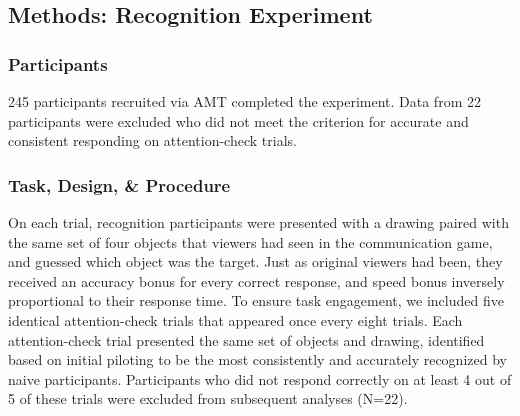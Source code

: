 \documentclass[10pt,letterpaper]{article}
\begin{document}

\subsection{Methods: Recognition Experiment}

\subsubsection{Participants}

245 participants recruited via AMT completed the experiment. Data from 22 participants were excluded who did not meet the criterion for accurate and consistent responding on attention-check trials.

\subsubsection{Task, Design, \& Procedure}

On each trial, recognition participants were presented with a drawing paired with the same set of four objects that viewers had seen in the communication game, and guessed which object was the target. 
Just as original viewers had been, they received an accuracy bonus for every correct response, and speed bonus inversely proportional to their response time. 
To ensure task engagement, we included five identical attention-check trials that appeared once every eight trials. 
Each attention-check trial presented the same set of objects and drawing, identified based on initial piloting to be the most consistently and accurately recognized by naive participants. 
Participants who did not respond correctly on at least 4 out of 5 of these trials were excluded from subsequent analyses (N=22).
\end{document}
